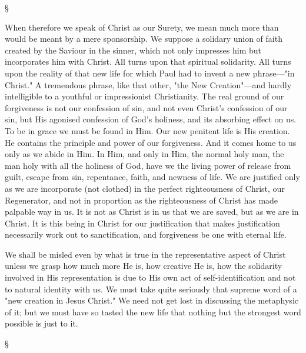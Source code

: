 \documentclass[12pt,letterpaper,oneside]{book}
\begin{document}
\begin{center}
\S
\end{center}

When therefore we speak of Christ as our 
Surety, we mean much more than would be 
meant by a mere sponsorship. We suppose a 
solidary union of faith created by the Saviour in 
the sinner, which not only impresses him but 
incorporates him with Christ. All turns upon 
that spiritual solidarity. All turns upon the 
reality of that new life for which Paul had to 
invent a new phrase---"in Christ." A tremendous 
phrase, like that other, "the New Creation"---and 
hardly intelligible to a youthful or impressionist 
Christianity. The real ground of our forgiveness 
is not our confession of sin, and not even 
Christ's confession of our sin, but His agonised 
confession of God's holiness, and its absorbing 
effect on us. To be in grace we must be 
found in Him. Our new penitent life is His 
creation. He contains the principle and power 
of our forgiveness. And it comes home to us 
only as we abide in Him. In Him, and only 
in Him, the normal holy man, the man holy 
with all the holiness of God, have we the 
living power of release from guilt, escape from 
sin, repentance, faith, and newness of life. 
We are justified only as we are incorporate 
(not clothed) in the perfect righteousness of 
Christ, our Regenerator, and not in proportion as the righteousness of Christ has made 
palpable way in us. It is not as Christ is in 
us that we are saved, but as we are in Christ. 
It is this being in Christ for our justification 
that makes justification necessarily work out 
to sanctification, and forgiveness be one with 
eternal life. 

We shall be misled even by what is true in the 
representative aspect of Christ unless we grasp 
how much more He is, how creative He is, how 
the solidarity involved in His representation is 
due to His own act of self-identification and 
not to natural identity with us. We must take 
quite seriously that supreme word of a "new 
creation in Jesus Christ." We need not get 
lost in discussing the metaphysic of it; but 
we must have so tasted the new life that 
nothing but the strongest word possible is just 
to it. 

\begin{center}
\S
\end{center}
\end{document}

